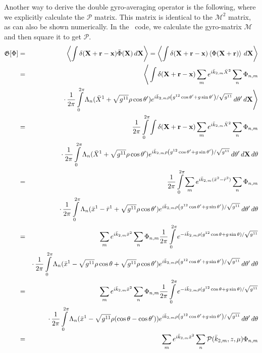 Another way to derive the double gyro-averaging operator is the
following, where we explicitly calculate the $\mathcal{P}$
matrix. This matrix is identical to the $\mathcal{M}^2$ matrix, as can
also be shown numerically. In the \gene\  code, we calculate the
gyro-matrix $\mathcal{M}$ and then square it to get $\mathcal{P}$. 
\begin{eqnarray*}
  \mathfrak{G}[\Phi]&=&\left\langle \int\delta(\mathbf{X}+\mathbf{r}-\mathbf{x})\bar{\Phi}(\mathbf{X})\,d\mathbf{X} \right\rangle 
  =\left\langle \int\delta(\mathbf{X}+\mathbf{r}-\mathbf{x})\left\langle \Phi(\mathbf{X}+\mathbf{r}) \right\rangle\,d\mathbf{X} \right\rangle \\
  &=& \Bigg\langle
    \int\delta(\mathbf{X}+\mathbf{r}-\mathbf{x}) 
    \sum_m e^{i\bar k_{2,m}\bar X^2} \sum_n \Phi_{n,m}\\
    &&\cdot\,\frac{1}{2\pi}\int\limits_0^{2\pi}
    \Lambda_n(\bar{X}^1+\sqrt{g^{11}}\rho\cos\theta')
    e^{i\bar{k}_{2,m} \rho\left(
        g^{12}\cos\theta'+g\sin\theta'
      \right)/\sqrt{g^{11}}
    }\,d\theta'\,d\mathbf{X}
  \Bigg\rangle \\
  &=& \frac{1}{2\pi}\int\limits_0^{2\pi} 
    \int\delta(\mathbf{X}+\mathbf{r}-\mathbf{x}) 
    \sum_m e^{i\bar k_{2,m}\bar X^2} \sum_n \Phi_{n,m}\\
    &&\cdot\,\frac{1}{2\pi}\int\limits_0^{2\pi}
    \Lambda_n(\bar{X}^1+\sqrt{g^{11}}\rho\cos\theta')
    e^{i\bar{k}_{2,m} \rho\left(
        g^{12}\cos\theta'+g\sin\theta'
      \right)/\sqrt{g^{11}}
    }\,d\theta'\,d\mathbf{X}
  \,d\theta \\
  &=& \frac{1}{2\pi}\int\limits_0^{2\pi} 
  \sum_m e^{i\bar k_{2,m}(\bar x^2-\bar r^2)} 
    \sum_n \Phi_{n,m}\\
    &&\cdot\,\frac{1}{2\pi}\int\limits_0^{2\pi}
    \Lambda_n(\bar{x}^1-\bar{r}^1+\sqrt{g^{11}}\rho\cos\theta')
    e^{i\bar{k}_{2,m} \rho\left(
        g^{12}\cos\theta'+g\sin\theta'
      \right)/\sqrt{g^{11}}
    }\,d\theta' \,d\theta \\
  &=& \sum_m e^{i\bar k_{2,m}\bar x^2} \sum_n \Phi_{n,m}
  \frac{1}{2\pi}\int\limits_0^{2\pi} e^{-i\bar k_{2,m}\rho(g^{12}\cos\theta+g\sin\theta)/\sqrt{g^{11}}} \\
  &&\cdot\,\frac{1}{2\pi}\int\limits_0^{2\pi}
  \Lambda_n(\bar{x}^1-\sqrt{g^{11}}\rho\cos\theta+\sqrt{g^{11}}\rho\cos\theta')
  e^{i\bar{k}_{2,m} \rho\left(
      g^{12}\cos\theta'+g\sin\theta'
    \right)/\sqrt{g^{11}}
  }\,d\theta' \,d\theta \\
  &=& \sum_m e^{i\bar k_{2,m}\bar x^2} \sum_n \Phi_{n,m}
  \frac{1}{2\pi}\int\limits_0^{2\pi} e^{-i\bar k_{2,m}\rho(g^{12}\cos\theta+g\sin\theta)/\sqrt{g^{11}}} \\
  &&\cdot\,\frac{1}{2\pi}\int\limits_0^{2\pi}
  \Lambda_n(\bar{x}^1-\sqrt{g^{11}}\rho(\cos\theta-\cos\theta'))
  e^{i\bar{k}_{2,m} \rho\left(
      g^{12}\cos\theta'+g\sin\theta'
    \right)/\sqrt{g^{11}}
  }\,d\theta' \,d\theta \\
  &=& \sum_m e^{i\bar k_{2,m}\bar x^2} \sum_n \mathcal{P}(\bar k_{2,m},z,\mu) \Phi_{n,m}
\end{eqnarray*}
